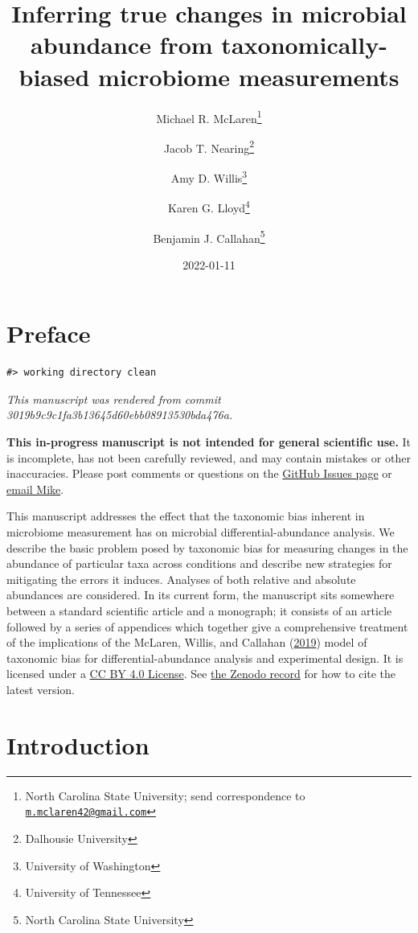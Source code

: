 \documentclass[
]{article}
\title{Inferring true changes in microbial abundance from taxonomically-biased microbiome measurements}
\author{Michael R. McLaren\footnote{North Carolina State University; send correspondence to \href{mailto:m.mclaren42@gmail.com}{\nolinkurl{m.mclaren42@gmail.com}}} \and Jacob T. Nearing\footnote{Dalhousie University} \and Amy D. Willis\footnote{University of Washington} \and Karen G. Lloyd\footnote{University of Tennessee} \and Benjamin J. Callahan\footnote{North Carolina State University}}
\date{2022-01-11}
\begin{document}
\maketitle

{
\setcounter{tocdepth}{2}
\tableofcontents
}
\hypertarget{preface}{%
\section*{Preface}\label{preface}}

\begin{verbatim}
#> working directory clean
\end{verbatim}

\emph{This manuscript was rendered from commit 3019b9c9c1fa3b13645d60ebb08913530bda476a.}

\leavevmode{}%
\textbf{This in-progress manuscript is not intended for general scientific use.}
It is incomplete, has not been carefully reviewed, and may contain mistakes or other inaccuracies.
Please post comments or questions on the \href{https://github.com/mikemc/differential-abundance-theory/issues}{GitHub Issues page} or \href{m.mclaren42@gmail.com}{email Mike}.

This manuscript addresses the effect that the taxonomic bias inherent in microbiome measurement has on microbial differential-abundance analysis.
We describe the basic problem posed by taxonomic bias for measuring changes in the abundance of particular taxa across conditions and describe new strategies for mitigating the errors it induces.
Analyses of both relative and absolute abundances are considered.
In its current form, the manuscript sits somewhere between a standard scientific article and a monograph;
it consists of an article followed by a series of appendices which together give a comprehensive treatment of the implications of the McLaren, Willis, and Callahan (\protect\hyperlink{ref-mclaren2019cons}{2019}) model of taxonomic bias for differential-abundance analysis and experimental design.
It is licensed under a \href{https://creativecommons.org/licenses/by/4.0/}{CC BY 4.0 License}.
See \href{https://doi.org/10.5281/zenodo.4552717}{the Zenodo record} for how to cite the latest version.

\hypertarget{introduction}{%
\section{Introduction}\label{introduction}}
\end{document}
